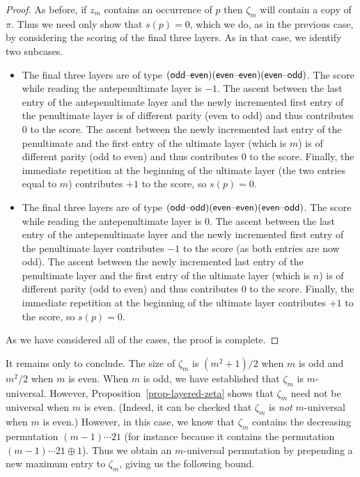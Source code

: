 \begin{proof}
	As before, if $z_m$ contains an occurrence of $p$ then $\zeta_m$ will contain a copy of $\pi$. Thus we need only show that $s(p)=0$, which we do, as in the previous case, by considering the scoring of the final three layers. As in that case, we identify two subcases.
	\begin{itemize}
		\item The final three layers are of type $(\textsf{odd}\text{--}\textsf{even})(\textsf{even}\text{--}\textsf{even})(\textsf{even}\text{--}\textsf{odd})$. The score while reading the antepenultimate layer is $-1$. The ascent between the last entry of the antepenultimate layer and the newly incremented first entry of the penultimate layer is of different parity (even to odd) and thus contributes $0$ to the score. The ascent between the newly incremented last entry of the penultimate and the first entry of the ultimate layer (which is $m$) is of different parity (odd to even) and thus contributes $0$ to the score. Finally, the immediate repetition at the beginning of the ultimate layer (the two entries equal to $m$) contributes $+1$ to the score, so $s(p)=0$.
		\item The final three layers are of type $(\textsf{odd}\text{--}\textsf{odd})(\textsf{even}\text{--}\textsf{even})(\textsf{even}\text{--}\textsf{odd})$. The score while reading the antepenultimate layer is $0$. The ascent between the last entry of the antepenultimate layer and the newly incremented first entry of the penultimate layer contributes $-1$ to the score (as both entries are now odd). The ascent between the newly incremented last entry of the penultimate layer and the first entry of the ultimate layer (which is $n$) is of different parity (odd to even) and thus contributes $0$ to the score. Finally, the immediate repetition at the beginning of the ultimate layer contributes $+1$ to the score, so $s(p)=0$.
	\end{itemize}

	As we have considered all of the cases, the proof is complete.
\end{proof}

It remains only to conclude. The size of $\zeta_m$ is $(m^2+1)/2$ when $m$ is odd and $m^2/2$ when $m$ is even. When $m$ is odd, we have established that $\zeta_m$ is $m$-universal. However, Proposition~\ref{prop-layered-zeta} shows that $\zeta_m$ need not be universal when $m$ is even. (Indeed, it can be checked that $\zeta_m$ is \emph{not} $m$-universal when $m$ is even.) However, in this case, we know that $\zeta_m$ contains the decreasing permutation $(m-1)\cdots 21$ (for instance because it contains the permutation $(m-1)\cdots 21\oplus 1$). Thus we obtain an $m$-universal permutation by prepending a new maximum entry to $\zeta_m$, giving us the following bound.

